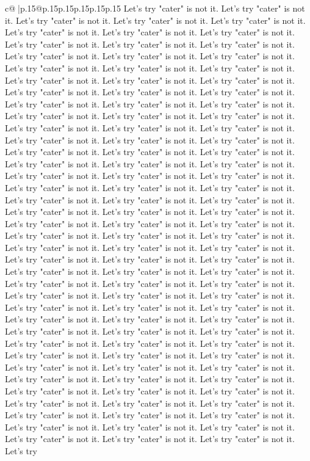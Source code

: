 \documentclass{article}
\begin{document}
{\begin{supertabular}{c@{$\;$}|p{.15\linewidth}@{}p{.15\linewidth}p{.15\linewidth}p{.15\linewidth}p{.15\linewidth}p{.15\linewidth}}
{{{Let's try "cater" is not it. Let's try "cater" is not it. Let's try "cater" is not it. Let's try "cater" is not it. Let's try "cater" is not it. Let's try "cater" is not it. Let's try "cater" is not it. Let's try "cater" is not it. Let's try "cater" is not it. Let's try "cater" is not it. Let's try "cater" is not it. Let's try "cater" is not it. Let's try "cater" is not it. Let's try "cater" is not it. Let's try "cater" is not it. Let's try "cater" is not it. Let's try "cater" is not it. Let's try "cater" is not it. Let's try "cater" is not it. Let's try "cater" is not it. Let's try "cater" is not it. Let's try "cater" is not it. Let's try "cater" is not it. Let's try "cater" is not it. Let's try "cater" is not it. Let's try "cater" is not it. Let's try "cater" is not it. Let's try "cater" is not it. Let's try "cater" is not it. Let's try "cater" is not it. Let's try "cater" is not it. Let's try "cater" is not it. Let's try "cater" is not it. Let's try "cater" is not it. Let's try "cater" is not it. Let's try "cater" is not it. Let's try "cater" is not it. Let's try "cater" is not it. Let's try "cater" is not it. Let's try "cater" is not it. Let's try "cater" is not it. Let's try "cater" is not it. Let's try "cater" is not it. Let's try "cater" is not it. Let's try "cater" is not it. Let's try "cater" is not it. Let's try "cater" is not it. Let's try "cater" is not it. Let's try "cater" is not it. Let's try "cater" is not it. Let's try "cater" is not it. Let's try "cater" is not it. Let's try "cater" is not it. Let's try "cater" is not it. Let's try "cater" is not it. Let's try "cater" is not it. Let's try "cater" is not it. Let's try "cater" is not it. Let's try "cater" is not it. Let's try "cater" is not it. Let's try "cater" is not it. Let's try "cater" is not it. Let's try "cater" is not it. Let's try "cater" is not it. Let's try "cater" is not it. Let's try "cater" is not it. Let's try "cater" is not it. Let's try "cater" is not it. Let's try "cater" is not it. Let's try "cater" is not it. Let's try "cater" is not it. Let's try "cater" is not it. Let's try "cater" is not it. Let's try "cater" is not it. Let's try "cater" is not it. Let's try "cater" is not it. Let's try "cater" is not it. Let's try "cater" is not it. Let's try "cater" is not it. Let's try "cater" is not it. Let's try "cater" is not it. Let's try "cater" is not it. Let's try "cater" is not it. Let's try "cater" is not it. Let's try "cater" is not it. Let's try "cater" is not it. Let's try "cater" is not it. Let's try "cater" is not it. Let's try "cater" is not it. Let's try "cater" is not it. Let's try "cater" is not it. Let's try "cater" is not it. Let's try "cater" is not it. Let's try "cater" is not it. Let's try "cater" is not it. Let's try "cater" is not it. Let's try "cater" is not it. Let's try "cater" is not it. Let's try "cater" is not it. Let's try "cater" is not it. Let's try "cater" is not it. Let's try "cater" is not it. Let's try "cater" is not it. Let's try "cater" is not it. Let's try "cater" is not it. Let's try "cater" is not it. Let's try "cater" is not it. Let's try "cater" is not it. Let's try "cater" is not it. Let's try "cater" is not it. Let's try }}}
\end{supertabular}}
\end{document}
